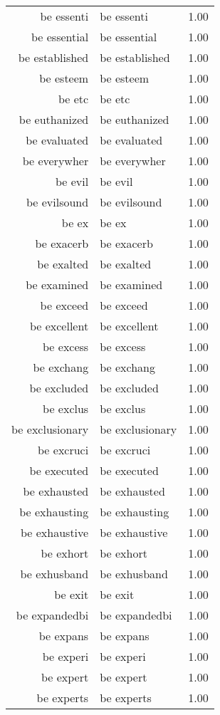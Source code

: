 \begin{table}[ht]
\begin{tabular}{rlr}
  be essenti & be essenti & 1.00 \\ 
  be essential & be essential & 1.00 \\ 
  be established & be established & 1.00 \\ 
  be esteem & be esteem & 1.00 \\ 
  be etc & be etc & 1.00 \\ 
  be euthanized & be euthanized & 1.00 \\ 
  be evaluated & be evaluated & 1.00 \\ 
  be everywher & be everywher & 1.00 \\ 
  be evil & be evil & 1.00 \\ 
  be evilsound & be evilsound & 1.00 \\ 
  be ex & be ex & 1.00 \\ 
  be exacerb & be exacerb & 1.00 \\ 
  be exalted & be exalted & 1.00 \\ 
  be examined & be examined & 1.00 \\ 
  be exceed & be exceed & 1.00 \\ 
  be excellent & be excellent & 1.00 \\ 
  be excess & be excess & 1.00 \\ 
  be exchang & be exchang & 1.00 \\ 
  be excluded & be excluded & 1.00 \\ 
  be exclus & be exclus & 1.00 \\ 
  be exclusionary & be exclusionary & 1.00 \\ 
  be excruci & be excruci & 1.00 \\ 
  be executed & be executed & 1.00 \\ 
  be exhausted & be exhausted & 1.00 \\ 
  be exhausting & be exhausting & 1.00 \\ 
  be exhaustive & be exhaustive & 1.00 \\ 
  be exhort & be exhort & 1.00 \\ 
  be exhusband & be exhusband & 1.00 \\ 
  be exit & be exit & 1.00 \\ 
  be expandedbi & be expandedbi & 1.00 \\ 
  be expans & be expans & 1.00 \\ 
  be experi & be experi & 1.00 \\ 
  be expert & be expert & 1.00 \\ 
  be experts & be experts & 1.00 \\ 

\end{tabular}
\end{table}
